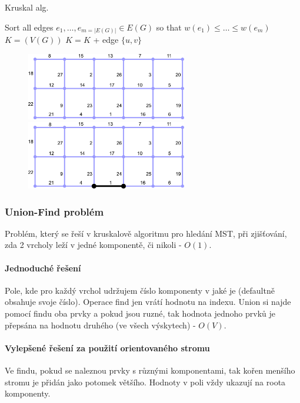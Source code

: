 \begin{algorithm}
\caption{Kruskal alg.}
\begin{algorithmic}
\State Sort all edges $e_1,\dots, e_{m=\vert E(G)\vert} \in E(G)$ so that $w(e_1) \leq \hdots \leq w(e_m)$
\State $K=(V(G))$
    \State $K = K$ + edge $\{u,v\}$
  \EndIf
\EndFor
\end{algorithmic}
\end{algorithm}

\begin{figure}[h]
    \begin{center}
        \includegraphics[width=70mm]{02/images/kruskal01}
        \hspace{10px}
        \includegraphics[width=70mm]{02/images/kruskal02}
    \end{center}
\end{figure}

\subsubsection{Union-Find problém}
Problém, který se řeší v kruskalově algoritmu pro hledání MST, při zjišťování, zda 2 vrcholy leží v jedné komponentě, či nikoli - $O(1)$.

\paragraph{Jednoduché řešení} Pole, kde pro každý vrchol udržujem číslo komponenty v jaké je (defaultně obsahuje svoje číslo). Operace find jen vrátí hodnotu na indexu. Union si najde pomocí findu oba prvky a pokud jsou ruzné, tak hodnota jednoho prvků je přepsána na hodnotu druhého (ve všech výskytech) - $O(V)$.

\paragraph{Vylepšené řešení za použití orientovaného stromu}
Ve findu, pokud se naleznou prvky s různými komponentami, tak kořen menšího stromu je přidán jako potomek většího. Hodnoty v poli vždy ukazují na roota komponenty.


